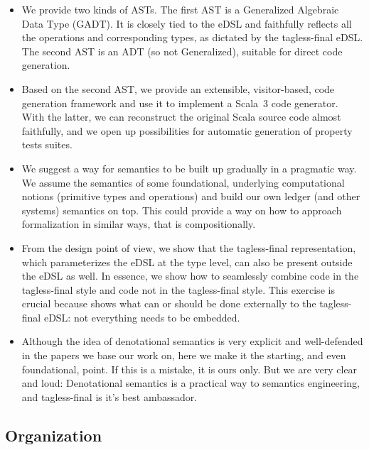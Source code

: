 \documentclass[11pt]{article}
\begin{document}
\begin{itemize}
  \item We provide two kinds of ASTs. The first AST is a Generalized 
  Algebraic Data Type (GADT). It is closely tied to the eDSL and faithfully 
  reflects all the operations and corresponding types, as dictated by the 
  tagless-final eDSL. The second AST is an ADT (so not Generalized), suitable 
  for direct code generation.
  
  \item Based on the second AST, we provide an extensible, visitor-based, 
  code generation framework and use it to implement a Scala~3 code generator. 
  With the latter, we can reconstruct the original Scala source code almost 
  faithfully, and we open up possibilities for automatic generation of 
  property tests suites.

  \item We suggest a way for semantics to be built up gradually in a 
  pragmatic way. We assume the semantics of some foundational, underlying 
  computational notions (primitive types and operations) and build our own 
  ledger (and other systems) semantics on top. This could provide a way on 
  how to approach formalization in similar ways, that is compositionally.

  \item From the design point of view, we show that the tagless-final 
  representation, which parameterizes the eDSL at the type level, can also be 
  present outside the eDSL as well. In essence, we show how to seamlessly 
  combine code in the tagless-final style and code not in the tagless-final 
  style. This exercise is crucial because shows what can or should be done 
  externally to the tagless-final eDSL: not everything needs to be embedded.

  \item Although the idea of denotational semantics is very explicit and 
  well-defended in the papers we base our work on, here we make it the 
  starting, and even foundational, point. If this is a mistake, it is ours 
  only. But we are very clear and loud: Denotational semantics is a practical 
  way to semantics engineering, and tagless-final is it's best ambassador.
\end{itemize}

\subsection{Organization}
\end{document}
